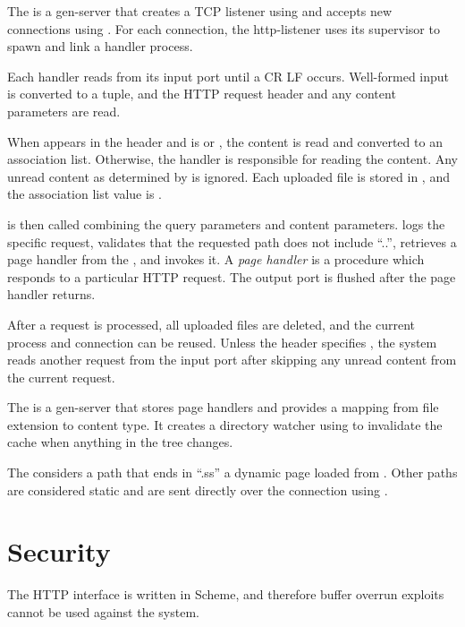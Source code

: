 The  is a gen-server that creates a TCP listener
using  and accepts new connections using
. For each connection, the http-listener uses its
supervisor to spawn and link a handler process.

Each handler reads from its input port until a CR LF
occurs. Well-formed input is converted to a  tuple,
and the HTTP request header and any content parameters are read.

When  appears in the header and
 is  or
, the content is read and
converted to an association list. Otherwise, the handler is
responsible for reading the content. Any unread content as determined
by  is ignored. Each uploaded file is stored in
, and the association list value is .

 is then called combining the
 query parameters and content
parameters.  logs the specific request,
validates that the requested path does not include ``..'', retrieves a
page handler from the , and invokes it. A
\emph{page handler} is a procedure which responds to a particular HTTP
request. The output port is flushed after the page handler returns.

After a request is processed, all uploaded files are deleted, and the
current process and connection can be reused. Unless the
 header specifies , the system reads
another request from the input port after skipping any unread content
from the current request.

The  is a gen-server that stores page handlers and
provides a mapping from file extension to content type. It creates a
directory watcher using  to invalidate the
cache when anything in the  tree changes.

The  considers a path that ends in ``.ss'' a
dynamic page loaded from . Other paths are
considered static and are sent directly over the connection using
.

\section {Security}

The HTTP interface is written in Scheme, and therefore buffer overrun
exploits cannot be used against the system.

